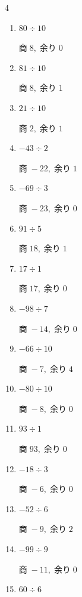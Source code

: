 \begin{multicols}{4}
\begin{enumerate}
        $商\; -14,\; 余り\; 2$

  \item $80 \div 10$

        $商\; 8,\; 余り\; 0$

  \item $81 \div 10$

        $商\; 8,\; 余り\; 1$

  \item $21 \div 10$

        $商\; 2,\; 余り\; 1$

  \item $-43 \div 2$

        $商\; -22,\; 余り\; 1$

  \item $-69 \div 3$

        $商\; -23,\; 余り\; 0$

  \item $91 \div 5$

        $商\; 18,\; 余り\; 1$

  \item $17 \div 1$

        $商\; 17,\; 余り\; 0$

  \item $-98 \div 7$

        $商\; -14,\; 余り\; 0$

  \item $-66 \div 10$

        $商\; -7,\; 余り\; 4$

  \item $-80 \div 10$

        $商\; -8,\; 余り\; 0$

\columnbreak %

  \item $93 \div 1$

        $商\; 93,\; 余り\; 0$

  \item $-18 \div 3$

        $商\; -6,\; 余り\; 0$

  \item $-52 \div 6$

        $商\; -9,\; 余り\; 2$

  \item $-99 \div 9$

        $商\; -11,\; 余り\; 0$

  \item $60 \div 6$


\end{enumerate}
\end{multicols}

